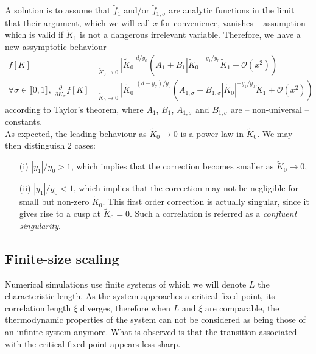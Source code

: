 \documentclass[class=report, float=false, crop=false]{standalone}
\begin{document}
A solution is to assume that $\tilde{f}_1$ and/or $\tilde{f}_{1,\sigma}$ are analytic functions in the limit that their argument, which we will call $x$ for convenience, vanishes -- assumption which is valid if $\tilde{K}_1$ is not a dangerous irrelevant variable. Therefore, we have a new assymptotic behaviour
\begin{equation}
\begin{aligned}
f[K] &\operatorname*{~=~}_{\tilde{K}_0\rightarrow0} \left|\tilde{K}_0\right|^{d/y_0} \left( A_1 + B_1 \left|\tilde{K}_0\right|^{-y_1/y_0}\tilde{K}_1 + \mathcal{O}\left(x^2\right)\right)\\
\forall \sigma \in \llbracket0,1\rrbracket,~ \frac{\partial}{\partial K_{\sigma}} f[K] &\operatorname*{~=~}_{\tilde{K}_0\rightarrow0} \left|\tilde{K}_0\right|^{(d-y_{\sigma})/y_0} \left( A_{1,\sigma} + B_{1,\sigma} \left|\tilde{K}_0\right|^{-y_1/y_0}\tilde{K}_1 + \mathcal{O}\left(x^2\right)\right)
\label{scaling_corrections}
\end{aligned}
\end{equation}
according to Taylor's theorem, where $A_1$, $B_1$, $A_{1,\sigma}$ and $B_{1,\sigma}$ are -- non-universal -- constants.\\

As expected, the leading behaviour as $\tilde{K}_0\rightarrow0$ is a power-law in $\tilde{K}_0$. We may then distinguish 2 cases:
\begin{itemize}
\item[(i)] $|y_1|/y_0 > 1$, which implies that the correction becomes smaller as $\tilde{K}_0\rightarrow0$,
\item[(ii)] $|y_1|/y_0 < 1$, which implies that the correction may not be negligible for small but non-zero $\tilde{K}_0$. This first order correction is actually singular, since it gives rise to a cusp \cite{wiki:cusp} at $\tilde{K}_0 = 0$. Such a correlation is referred as a \textit{confluent singularity}.
\end{itemize}

\subsection{Finite-size scaling}

Numerical simulations use finite systems of which we will denote $L$ the characteristic length. As the system approaches a critical fixed point, its correlation length $\xi$ diverges, therefore when $L$ and $\xi$ are comparable, the thermodynamic properties of the system can not be considered as being those of an infinite system anymore. What is observed is that the transition associated with the critical fixed point appears less sharp.\\
\end{document}

